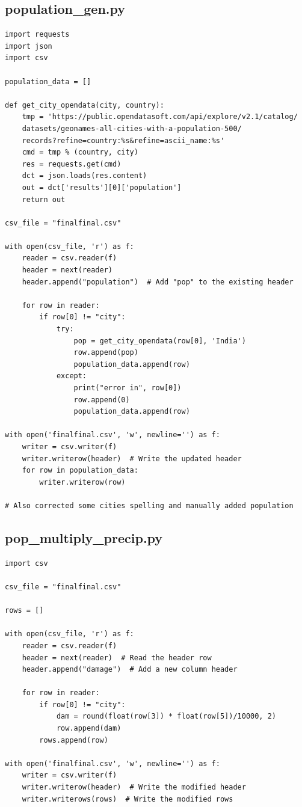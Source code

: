 \documentclass[a4paper,12pt]{report}
\begin{document}
\subsection{population\_gen.py}

\begin{lstlisting}
import requests
import json
import csv

population_data = []

def get_city_opendata(city, country):
    tmp = 'https://public.opendatasoft.com/api/explore/v2.1/catalog/
    datasets/geonames-all-cities-with-a-population-500/
    records?refine=country:%s&refine=ascii_name:%s'
    cmd = tmp % (country, city)
    res = requests.get(cmd)
    dct = json.loads(res.content)
    out = dct['results'][0]['population']
    return out

csv_file = "finalfinal.csv"

with open(csv_file, 'r') as f:
    reader = csv.reader(f)
    header = next(reader)
    header.append("population")  # Add "pop" to the existing header

    for row in reader:
        if row[0] != "city":
            try:
                pop = get_city_opendata(row[0], 'India')
                row.append(pop)
                population_data.append(row)
            except:
                print("error in", row[0])
                row.append(0)
                population_data.append(row)

with open('finalfinal.csv', 'w', newline='') as f:
    writer = csv.writer(f)
    writer.writerow(header)  # Write the updated header
    for row in population_data:
        writer.writerow(row)

# Also corrected some cities spelling and manually added population
\end{lstlisting}

\subsection{pop\_multiply\_precip.py}

\begin{lstlisting}
import csv

csv_file = "finalfinal.csv"

rows = []

with open(csv_file, 'r') as f:
    reader = csv.reader(f)
    header = next(reader)  # Read the header row
    header.append("damage")  # Add a new column header

    for row in reader:
        if row[0] != "city":
            dam = round(float(row[3]) * float(row[5])/10000, 2)
            row.append(dam)
        rows.append(row)

with open('finalfinal.csv', 'w', newline='') as f:
    writer = csv.writer(f)
    writer.writerow(header)  # Write the modified header
    writer.writerows(rows)  # Write the modified rows
   
\end{lstlisting}
\end{document}

